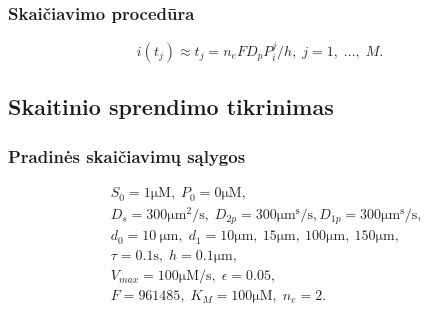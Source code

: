 \documentclass[12pt, a4paper, lithuanian]{article}
\begin{document}
% 
% 
% 
% 
\subsubsection{Skaičiavimo procedūra}

\begin{equation} 
    i(t_j) \approx t_j = n_eFD_pP_i^j/h,\; j=1,\;...,\;M. 
\end{equation}

\subsection{Skaitinio sprendimo tikrinimas}
\subsubsection{Pradinės skaičiavimų sąlygos}
 
 \begin{equation}
 \begin{aligned}
     &S_0 = 1 \mathrm{\mu M},\; P_0 = 0 \mathrm{\mu M},\\
     &D_s = 300 \mathrm{\mu m^2/s},\; D_{2p} = 300 \mathrm{\mu m^s/s}, D_{1p} = 300 \mathrm{\mu m^s/s},\\\
     &d_0 = 10\ \mathrm{\mu m},\; d_1 = 10 \mathrm{\mu
 m},\ 15 \mathrm{\mu m},\ 100 \mathrm{\mu m},\ 150\mathrm{\mu m},\;\\
     &\tau = 0.1\mathrm{s},\; h=0.1 \mathrm{\mu m},\\
     &V_{max} = 100\mathrm{\mu M /s},\; \epsilon = 0.05,\\
     &F=961485,\; K_M= 100\mathrm{\mu M},\; n_e = 2.
 \end{aligned}
 \end{equation}
 
\end{document}
